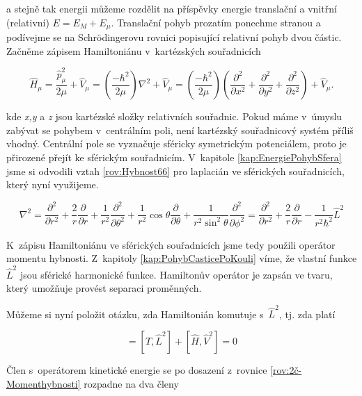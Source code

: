 \noindent a stejně tak energii můžeme rozdělit na příspěvky energie translační a vnitřní (relativní) $ E=E_{M}+E_{\mu} $. Translační pohyb prozatím ponechme stranou a podívejme se na Schr\"odingerovu rovnici popisující relativní pohyb dvou částic. Začněme zápisem Hamiltoniánu v~kartézských souřadnicích

\begin{equation}
\hat{H}_{\mu}=\frac{{\hat{p}}_{\mu}^{2}}{2\mu}+\hat{V}_{\mu}=\left(\frac{-\hbar^{2}}{2\mu}\right)\nabla^{2}+\hat{V}_{\mu}=\left(\frac{-\hbar^{2}}{2\mu}\right)\left(\frac{\partial^{2}}{\partial x^{2}}+\frac{\partial^{2}}{\partial y^{2}}+\frac{\partial^{2}}{\partial z^{2}}\right)+\hat{V}_{\mu}.
\label{rov:2č-SferHamil}
\end{equation}

\noindent kde \textit{x,y} a \textit{z} jsou kartézské složky relativních souřadnic. Pokud máme v~úmyslu zabývat se pohybem v~centrálním poli, není kartézský souřadnicový systém příliš vhodný. Centrální pole se vyznačuje sféricky symetrickým potenciálem, proto je přirozené přejít ke sférickým souřadnicím. V~kapitole \ref{kap:EnergiePohybSfera} jsme si odvodili vztah \eqref{rov:Hybnost66} pro laplacián ve sférických souřadnicích, který nyní využijeme.

\begin{equation}
\nabla^{2}=\frac{\partial^{2}}{\partial r^{2}}+\frac{2}{r}\frac{\partial}{\partial r}+\frac{1}{r^{2}}\frac{\partial^{2}}{\partial \theta^{2}}+\frac{1}{r^{2}}\cos\theta\frac{\partial}{\partial \theta}+\frac{1}{r^2\sin^2\theta}\frac{\partial^{2}}{\partial \phi^{2}}=\frac{\partial^{2}}{\partial r^{2}}+\frac{2}{r}\frac{\partial}{\partial r}-\frac{1}{r^2\hbar^2}\hat{L}^2
\label{rov:2č-Momenthybnosti}
\end{equation}

K~zápisu Hamiltoniánu ve sférických souřadnicích jsme tedy použili operátor momentu hybnosti. Z~kapitoly \ref{kap:PohybCasticePoKouli} víme, že vlastní funkce $\hat{L}^2$ jsou sférické harmonické funkce. Hamiltonův operátor je zapsán ve tvaru, který umožňuje provést separaci proměnných. 


Můžeme si nyní položit otázku, zda Hamiltonián komutuje s~$\hat{L}^2$, tj. zda platí

\begin{equation}
[\hat{H},\hat{L}^{2}]=[\hat{T},\hat{L}^{2}]+[\hat{H},\hat{V}^{2}]=0   
\label{rov:2č-komutator}
\end{equation}

\noindent Člen s~operátorem kinetické energie se po dosazení z~rovnice \eqref{rov:2č-Momenthybnosti} rozpadne na dva členy


